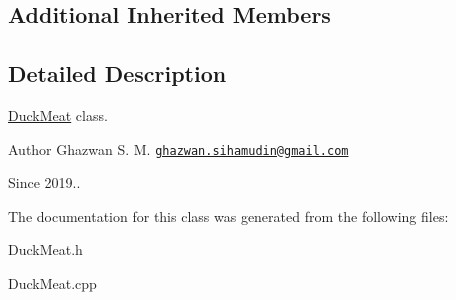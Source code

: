 \subsection*{Additional Inherited Members}


\subsection{Detailed Description}
\hyperlink{classDuckMeat}{Duck\+Meat} class.

\begin{DoxyAuthor}{Author}
Ghazwan S. M. \href{mailto:ghazwan.sihamudin@gmail.com}{\tt ghazwan.\+sihamudin@gmail.\+com} 
\end{DoxyAuthor}
\begin{DoxySince}{Since}
2019.. 
\end{DoxySince}


The documentation for this class was generated from the following files\+:\begin{DoxyCompactItemize}
\item 
Duck\+Meat.\+h\item 
Duck\+Meat.\+cpp\end{DoxyCompactItemize}
